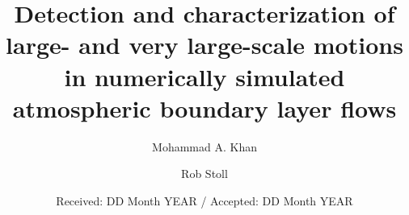 \documentclass{svjour3}                     %
\begin{document}
\title{Detection and characterization of large- and very large-scale motions in numerically simulated atmospheric boundary layer flows %
}


\author{Mohammad A. Khan         \and
        Rob Stoll %
}



\date{Received: DD Month YEAR / Accepted: DD Month YEAR}
\end{document}
